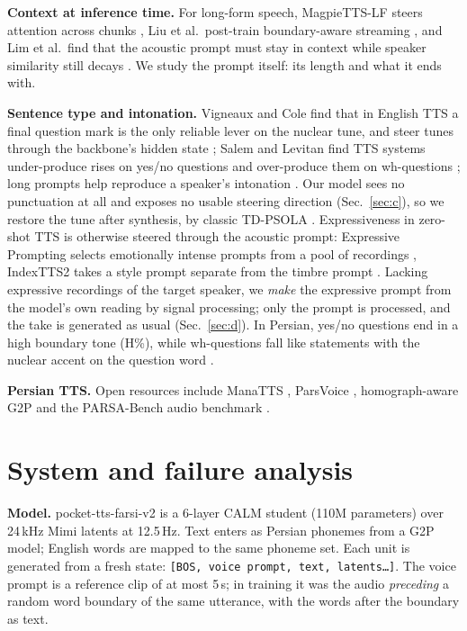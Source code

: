 \documentclass[conference]{IEEEtran}
\begin{document}
\textbf{Context at inference time.} For long-form speech, MagpieTTS-LF steers attention across chunks
\cite{magpielf2026}, Liu et al.\ post-train boundary-aware streaming \cite{liu2026boundary}, and Lim et al.\
find that the acoustic prompt must stay in context while speaker similarity still decays
\cite{lim2026longer}. We study the prompt itself: its length and what it ends with.

\textbf{Sentence type and intonation.} Vigneaux and Cole find that in English TTS a final question mark
is the only reliable lever on the nuclear tune, and steer tunes through the backbone's hidden state
\cite{vigneaux2026tunes}; Salem and Levitan find TTS systems under-produce rises on yes/no questions and
over-produce them on wh-questions \cite{salem2026question}; long prompts help reproduce a speaker's
intonation \cite{chen2026lptts}. Our model sees no punctuation at all and exposes no usable steering
direction (Sec.~\ref{sec:c}), so we restore the tune after synthesis, by classic TD-PSOLA \cite{psola1990}.
Expressiveness in zero-shot TTS is otherwise steered through the acoustic prompt: Expressive Prompting
selects emotionally intense prompts from a pool of recordings \cite{expprompt2026}, IndexTTS2 takes a style
prompt separate from the timbre prompt \cite{indextts2026}. Lacking expressive recordings of the target
speaker, we \emph{make} the expressive prompt from the model's own reading by signal processing; only the
prompt is processed, and the take is generated as usual (Sec.~\ref{sec:d}).
In Persian, yes/no questions end in a high boundary tone (H\%), while wh-questions fall like statements
with the nuclear accent on the question word \cite{sadat2011}.

\textbf{Persian TTS.} Open resources include ManaTTS \cite{manatts2025}, ParsVoice \cite{parsvoice2026},
homograph-aware G2P \cite{homorich2025} and the PARSA-Bench audio benchmark \cite{parsabench2026}.

\section{System and failure analysis}\label{sec:system}
\textbf{Model.} pocket-tts-farsi-v2 \cite{farsiv2} is a 6-layer CALM student (110M parameters) over 24\,kHz
Mimi \cite{moshi2024} latents at 12.5\,Hz. Text enters as Persian phonemes from a G2P model; English words are mapped to the
same phoneme set. Each unit is generated from a fresh state: \texttt{[BOS, voice prompt, text, latents\dots]}.
The voice prompt is a reference clip of at most 5\,s; in training it was the audio \emph{preceding} a random
word boundary of the same utterance, with the words after the boundary as text.
\end{document}
